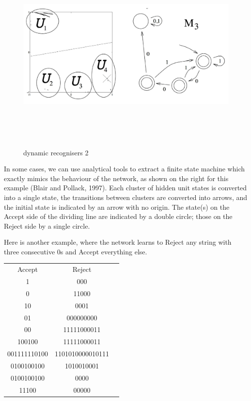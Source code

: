 \documentclass[11pt]{article}
\begin{document}
\begin{figure}[h]
    \centering
    \includegraphics[width=12cm, height=10cm]{../out/images/dynamic-recognisers-2}
    \caption{dynamic recognisers 2}
    \label{fig: dynamic recognisers 2}
\end{figure}

In some cases, we can use analytical tools to extract a finite state machine
which exactly mimics the behaviour of the network, as shown on the right for
this example (Blair and Pollack, 1997).
Each cluster of hidden unit states is converted into a single state, the
transitions between clusters are converted into arrows, and the initial state
is indicated by an arrow with no origin.
The state(s) on the Accept side of the dividing line are indicated by a double
circle;
those on the Reject side by a single circle.

Here is another example, where the network learns to Reject any string with
three consecutive $0$s and Accept everything else.

\begin{center}
\begin{tabular}{ |c|c|c| }
 \hline
 Accept & Reject \\
 1 & 000 \\
 0 & 11000 \\
 10 & 0001 \\
 01 & 000000000 \\
 00 & 11111000011 \\
 100100 & 11111000011 \\
 001111110100 & 1101010000010111 \\
 0100100100 & 1010010001 \\
 0100100100 & 0000 \\
 11100 & 00000 \\
 \hline
\end{tabular}
\end{center}
\end{document}
